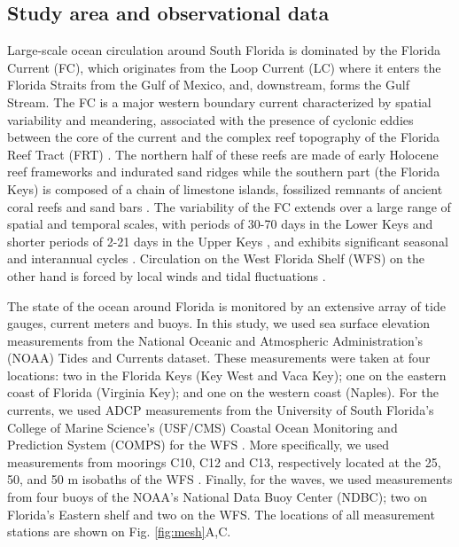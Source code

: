 \documentclass[preprint,12pt,authoryear]{elsarticle}
\begin{document}
\subsection{Study area and observational data}
Large-scale ocean circulation around South Florida is dominated by the Florida Current (FC), which originates from the Loop Current (LC) where it enters the Florida Straits from the Gulf of Mexico, and, downstream, forms the Gulf Stream. The FC is a major western boundary current characterized by spatial variability and meandering, associated with the presence of cyclonic eddies between the core of the current and the complex reef topography of the Florida Reef Tract (FRT) \citep{lee1995florida,kourafalou2012florida}. The northern half of these reefs are made of early Holocene reef frameworks and indurated sand ridges while the southern part (the Florida Keys) is composed of a chain of limestone islands, fossilized remnants of ancient coral reefs and sand bars \citep{hoffmeister1968geology,shinn1988geology,lidz1991paleoshorelines}. The variability of the FC extends over a large range of spatial and temporal scales, with periods of 30-70 days in the Lower Keys \citep{lee1995florida} and shorter periods of 2-21 days in the Upper Keys \citep{lee1977low}, and exhibits significant seasonal and interannual cycles \citep{johns1987meandering, lee1988wind,schott1988variability}. Circulation on the West Florida Shelf (WFS) on the other hand is forced by local winds and tidal fluctuations \citep{lee2002volume,liu2012seasonal}.

The state of the ocean around Florida is monitored by an extensive array of tide gauges, current meters and buoys. In this study, we used sea surface elevation measurements from the National Oceanic and Atmospheric Administration’s (NOAA) Tides and Currents dataset. These measurements were taken at four locations: two in the Florida Keys (Key West and Vaca Key); one on the eastern coast of Florida (Virginia Key); and one on the western coast (Naples). For the currents, we used ADCP measurements from the University of South Florida's College of Marine Science's (USF/CMS) Coastal Ocean Monitoring and Prediction System (COMPS) for the WFS \citep{weisberg2009mean}. More specifically, we used measurements from moorings C10, C12 and C13, respectively located at the 25, 50, and 50 m isobaths of the WFS \citep{liu2020impacts}. Finally, for the waves, we used measurements from four buoys of the NOAA's National Data Buoy Center (NDBC); two on Florida's Eastern shelf and two on the WFS. The locations of all measurement stations are shown on Fig. \ref{fig:mesh}A,C.
\end{document}
